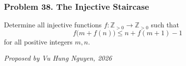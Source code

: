 \subsubsection*{Problem 38. The Injective Staircase}

\begin{exercisebox}[medium]

Determine all injective functions $f:\mathbb Z_{>0}\to\mathbb Z_{>0}$ such that
\[
\boxed{\quad f\bigl(m+f(n)\bigr)\le n+f(m+1)-1\quad}
\]
for all positive integers $m,n$.

\begin{flushright}
\textit{Proposed by Vu Hung Nguyen, 2026}
\end{flushright}


\end{exercisebox}
